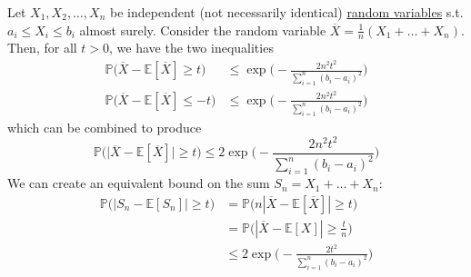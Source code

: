     \begin{theorem}
      \label{thm:hoeffdings-inequality}
      Let $X_1, X_2, \ldots, X_n$ be independent (not necessarily identical) \hyperref[def:random-variable]{random variables} s.t. $a_i \leq X_i \leq b_i$ almost surely. Consider the random variable $\overline{X} = \frac{1}{n} (X_1 + \ldots + X_n)$. Then, for all $t > 0$, we have the two inequalities
      \begin{align*}
        \mathbb{P}\big( \overline{X} - \mathbb{E}[\overline{X}] \geq t \big) & \leq \exp \bigg( -\frac{2 n^2 t^2}{\sum_{i=1}^n (b_i - a_i)^2} \bigg) \\
        \mathbb{P}\big( \overline{X} - \mathbb{E}[\overline{X}] \leq -t \big) & \leq \exp \bigg( -\frac{2 n^2 t^2}{\sum_{i=1}^n (b_i - a_i)^2} \bigg)
      \end{align*}
      which can be combined to produce 
      \begin{equation}
        \mathbb{P}\big( \big| \overline{X} - \mathbb{E}[\overline{X}] \big| \geq t \big) \leq 2 \exp \bigg( -\frac{2 n^2 t^2}{\sum_{i=1}^n (b_i - a_i)^2} \bigg)
      \end{equation}
      We can create an equivalent bound on the sum $S_n = X_1 + \ldots + X_n$: 
      \begin{align*}
        \mathbb{P}\big(| S_n - \mathbb{E}[S_n] | \geq t\big) & = \mathbb{P}\big( n |\overline{X} - \mathbb{E}[\overline{X}] | \geq t \big) \\
          & = \mathbb{P} \big( |\overline{X} - \mathbb{E}[X] | \geq \frac{t}{n} \big) \\
          & \leq 2 \exp \bigg( -\frac{2 t^2}{\sum_{i=1}^n (b_i - a_i)^2} \bigg) 
      \end{align*}
    \end{theorem}
